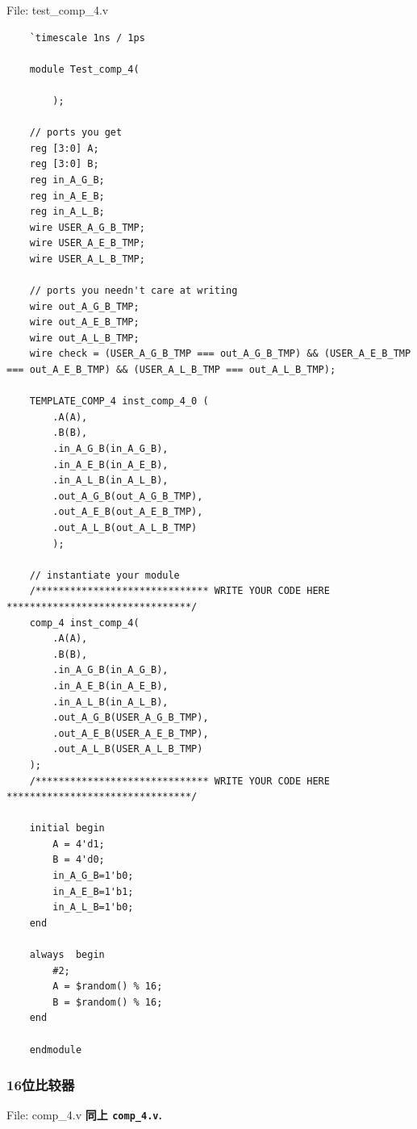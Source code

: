 \documentclass{article}
\begin{document}
File: test\_comp\_4.v
\begin{lstlisting}
    `timescale 1ns / 1ps

    module Test_comp_4(
    
        );
    
    // ports you get
    reg [3:0] A;
    reg [3:0] B;
    reg in_A_G_B;
    reg in_A_E_B;
    reg in_A_L_B;
    wire USER_A_G_B_TMP;
    wire USER_A_E_B_TMP;
    wire USER_A_L_B_TMP;
    
    // ports you needn't care at writing
    wire out_A_G_B_TMP;
    wire out_A_E_B_TMP;
    wire out_A_L_B_TMP;
    wire check = (USER_A_G_B_TMP === out_A_G_B_TMP) && (USER_A_E_B_TMP === out_A_E_B_TMP) && (USER_A_L_B_TMP === out_A_L_B_TMP); 
    
    TEMPLATE_COMP_4 inst_comp_4_0 (
        .A(A),
        .B(B),
        .in_A_G_B(in_A_G_B),
        .in_A_E_B(in_A_E_B),
        .in_A_L_B(in_A_L_B),
        .out_A_G_B(out_A_G_B_TMP),
        .out_A_E_B(out_A_E_B_TMP),
        .out_A_L_B(out_A_L_B_TMP)
        );
    
    // instantiate your module
    /****************************** WRITE YOUR CODE HERE ********************************/
    comp_4 inst_comp_4(
        .A(A),
        .B(B),
        .in_A_G_B(in_A_G_B),
        .in_A_E_B(in_A_E_B),
        .in_A_L_B(in_A_L_B),
        .out_A_G_B(USER_A_G_B_TMP),
        .out_A_E_B(USER_A_E_B_TMP),
        .out_A_L_B(USER_A_L_B_TMP)
    );
    /****************************** WRITE YOUR CODE HERE ********************************/
    
    initial begin
        A = 4'd1;
        B = 4'd0;
        in_A_G_B=1'b0;
        in_A_E_B=1'b1;
        in_A_L_B=1'b0;
    end
    
    always  begin
        #2;
        A = $random() % 16;
        B = $random() % 16;
    end
    
    endmodule    
\end{lstlisting}

\subsubsection{16位比较器}

File: comp\_4.v
\textbf{同上 \texttt{comp\_4.v}.}
\end{document}
